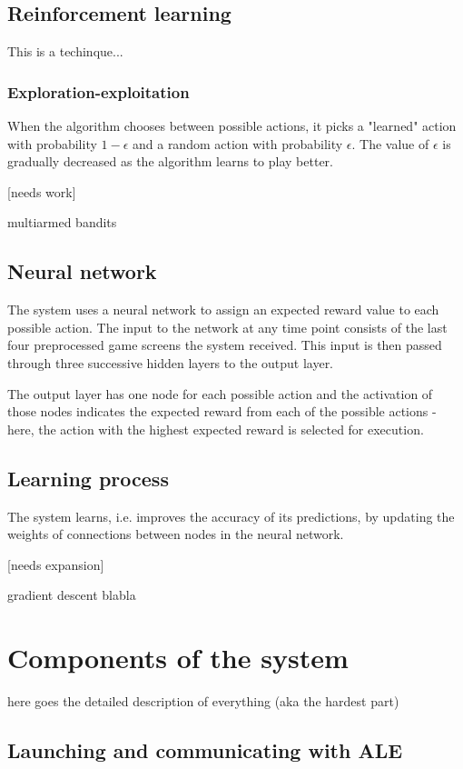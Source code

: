 \documentclass[a4paper,12pt]{article}
\begin{document}
\subsection{Reinforcement learning}
This is a techinque... 

\subsubsection{Exploration-exploitation}
When the algorithm chooses between possible actions, it picks a "learned" action with probability $1-\epsilon$ and a random action with probability $\epsilon$. The value of $\epsilon$ is gradually decreased as the algorithm learns to play better.

[needs work]

multiarmed bandits

\subsection{Neural network}
The system uses a neural network to assign an expected reward value to each possible action. The input to the network at any time point consists of the last four preprocessed game screens the system received. This input is then passed through three successive hidden layers to the output layer. 

The output layer has one node for each possible action and the activation of those nodes indicates the expected reward from each of the possible actions - here, the action with the highest expected reward is selected for execution.

\subsection{Learning process}
The system learns, i.e. improves the accuracy of its predictions, by updating the weights of connections between nodes in the neural network.

[needs expansion]

gradient descent blabla



%
%
\pagebreak
\section{Components of the system}
here goes the detailed description of everything (aka the hardest part)


\subsection{Launching and communicating with ALE}
\end{document}
